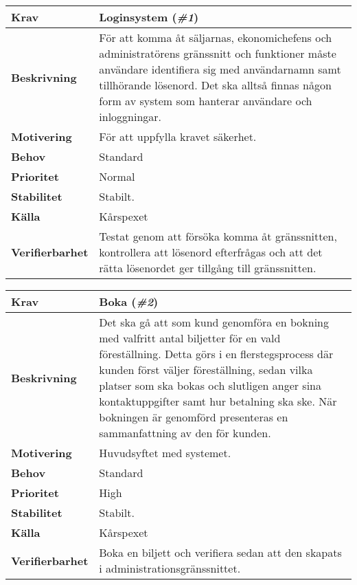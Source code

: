 \documentclass[a4paper, twoside, 11pt, titlepage]{article}
\begin{document}
	\begin{tabular} { p{2.6cm} p{12.5cm} }
		\hline
		\sffamily\textbf{Krav} & Loginsystem (\emph{\#1})  \\
		\hline
		\sffamily\textbf{Beskrivning} & För att komma åt säljarnas, ekonomichefens och administratörens gränssnitt och funktioner måste användare identifiera sig med användarnamn samt tillhörande lösenord. Det ska alltså finnas någon form av system som hanterar användare och inloggningar.  \\
		\hline
		\sffamily\textbf{Motivering} & För att uppfylla kravet säkerhet.  \\
		\hline
		\sffamily\textbf{Behov} & Standard  \\
		\hline
		\sffamily\textbf{Prioritet} & Normal  \\
		\hline
		\sffamily\textbf{Stabilitet} & Stabilt.  \\
		\hline
		\sffamily\textbf{Källa} & Kårspexet  \\
		\hline
		\sffamily\textbf{Verifierbarhet} & Testat genom att försöka komma åt gränssnitten, kontrollera att lösenord efterfrågas och att det rätta lösenordet ger tillgång till gränssnitten.  \\
		\hline
	\end{tabular}
	\vspace{6mm}

	\begin{tabular} { p{2.6cm} p{12.5cm} }
		\hline
		\sffamily\textbf{Krav} & Boka (\emph{\#2})  \\
		\hline
		\sffamily\textbf{Beskrivning} & Det ska gå att som kund genomföra en bokning med valfritt antal biljetter för en vald föreställning. Detta görs i en flerstegsprocess där kunden först väljer föreställning, sedan vilka platser som ska bokas och slutligen anger sina kontaktuppgifter samt hur betalning ska ske. När bokningen är genomförd presenteras en sammanfattning av den för kunden.  \\
		\hline
		\sffamily\textbf{Motivering} & Huvudsyftet med systemet.  \\
		\hline
		\sffamily\textbf{Behov} & Standard  \\
		\hline
		\sffamily\textbf{Prioritet} & High  \\
		\hline
		\sffamily\textbf{Stabilitet} & Stabilt.  \\
		\hline
		\sffamily\textbf{Källa} & Kårspexet  \\
		\hline
		\sffamily\textbf{Verifierbarhet} & Boka en biljett och verifiera sedan att den skapats i administrationsgränssnittet.  \\
		\hline
	\end{tabular}
	\vspace{6mm}
\end{document}
